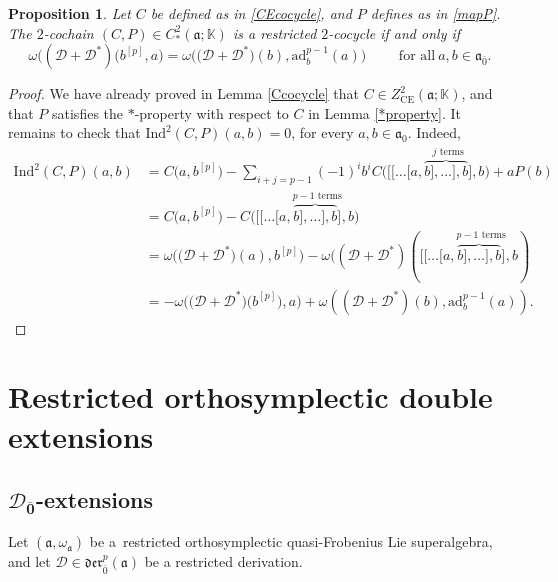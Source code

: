 \documentclass[pdftex]{sigma}
\numberwithin{equation}{section}
\newtheorem{Proposition}[Theorem]{Proposition}
 { \theoremstyle{definition}
\newtheorem{Definition}[Theorem]{Definition}
\newtheorem{Note}[Theorem]{Note}
\newtheorem{Example}[Theorem]{Example}
\newtheorem{Remark}[Theorem]{Remark} }
\begin{document}
\begin{Proposition}\label{CP2cocycle}
Let $C$ be defined as in \eqref{CEcocycle}, and $P$ defines as in \eqref{mapP}. The $2$-cochain $(C,P)\in C^2_*(\mathfrak{a};\mathbb{K})$ is a restricted $2$-cocycle if and only if
\[
\omega(({\mathscr D}+{\mathscr D}^*)\bigl(b^{[p]}, a\bigr) = \omega\bigl(\bigl({\mathscr D}+{\mathscr D}^*\bigr)(b), \mathrm{ad}_b^{p-1}(a)\bigr)\qquad \text{ for all}\ a,b\in \mathfrak{a}_{\bar 0}.
\]
\end{Proposition}

\begin{proof}
We have already proved in Lemma \ref{Ccocycle} that $C\in Z^2_{\mathrm{CE}}(\mathfrak{a}; \mathbb{K})$, and that $P$ satisfies the $*$-property with respect to $C$ in Lemma \ref{*property}. It remains to check that $\mathrm{Ind}^2(C,P)(a,b)=0$, for every $a,b\in\mathfrak{a}_0.$ Indeed,
\begin{align*}
 \mathrm{Ind}^2(C,P)(a,b)&=C\bigl( a,b^{[p]}\bigr) - \sum_{i+j=p-1}(-1)^ib^i C\bigl( [[\dots [a,\overset{j\text{ terms}}{\overbrace{b],\dots ],b}]},b\bigr)+aP(b)\\
 &=C\bigl(a,b^{[p]}\bigr)-C\bigl([[\dots [a,\overset{p-1\text{ terms}}{\overbrace{b],\dots ],b}]},b\bigr)\\
 &=\omega\bigl(\bigl({\mathscr D}+{\mathscr D}^*\bigr)(a),b^{[p]}\bigr)-\omega(({\mathscr D}+{\mathscr D}^*)([[\dots [a,\overset{p-1\text{ terms}}{\overbrace{b],\dots ],b}]},b)\\
 &=-\omega\bigl(\bigl({\mathscr D}+{\mathscr D}^*\bigr)\bigl(b^{[p]}\bigr),a\bigr)+\omega(({\mathscr D}+{\mathscr D}^*)(b),\mathrm{ad}_b^{p-1}(a)).\tag*{\qed}
\end{align*}
\renewcommand{\qed}{}
\end{proof}
\section{Restricted orthosymplectic double extensions}\label{results}
 \subsection[D\_0 -extensions]{$\boldsymbol{{\mathscr D}_{\bar 0}}$-extensions}\label{D0omega0}

Let $(\mathfrak{a}, \omega_\mathfrak{a})$ be a~restricted orthosymplectic quasi-Frobenius Lie superalgebra, and let ${\mathscr D}\in \mathfrak{der}_{\bar 0}^p
(\mathfrak{a})$ be a restricted derivation.
\end{document}
